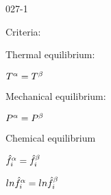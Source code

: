 \begin{mitframe}{027-1}


	\begin{listone}

		\item Criteria:

		\begin{listtwo}
        		
        	\item Thermal equilibrium:
    		
            \begin{listthree}
            
            	\item$\Temp^{\tdiff}=\Temp^{\texpcoeff}$
			
            \end{listthree}

		
			\item Mechanical equilibrium:
				
            \begin{listthree}
            
                \item$\p^{\tdiff}=\p^{\texpcoeff}$
            
            \end{listthree}		        
        
			\item Chemical equilibrium

            \begin{listthree}

				\item$\hat\fug_{\state}^{\tdiff}=\hat{\fug}_{\state}^{\texpcoeff}$
                
                \item $ln\hat{\fug}_{\state}^{\tdiff}=ln\hat{\fug}_{\state}^{\texpcoeff}$
                
            \end{listthree}                

		 \end{listtwo}
	
    \end{listone}

\end{mitframe}
